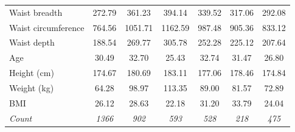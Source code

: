 \documentclass[12pt,a4paper,openany,UKenglish]{scrreprt}
\begin{document}
\begin{table}[H]
\begin{tabular}{lcccccc}
		Waist breadth                & 272.79                               & 361.23       & 394.14       & 339.52       & 317.06        & 292.08       \\
		Waist circumference          & 764.56                               & 1051.71      & 1162.59      & 987.48       & 905.36        & 833.12       \\
		Waist depth                  & 188.54                               & 269.77       & 305.78       & 252.28       & 225.12        & 207.64       \\
		\hline
		Age                          & 30.49                                & 32.70        & 25.43        & 32.74        & 31.47         & 26.80        \\
		Height (cm)                  & 174.67                               & 180.69       & 183.11       & 177.06       & 178.46        & 174.84       \\
		Weight (kg)                  & 64.28                                & 98.97        & 113.35       & 89.00        & 81.57         & 72.89        \\
		BMI                          & 26.12                                & 28.63        & 22.18        & 31.20        & 33.79         & 24.04        \\
		\hline
		\textit{Count}               & \textit{1366}                         & \textit{902} & \textit{593} & \textit{528} & \textit{218} & \textit{475}
	\end{tabular}
\end{table}
\end{document}
